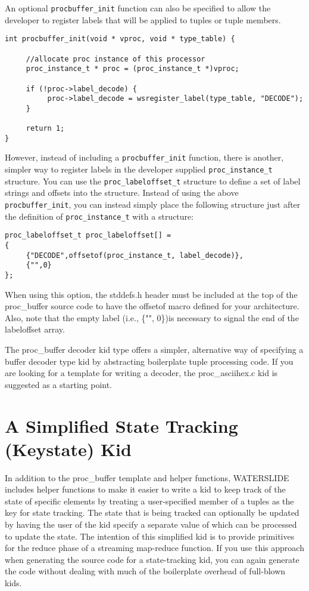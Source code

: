 \documentclass[11pt]{article}
\begin{document}
An optional \texttt{procbuffer\_init} function can also be specified to allow 
the developer to register labels that will be applied to tuples or tuple 
members.

\begin{lstlisting}
int procbuffer_init(void * vproc, void * type_table) {

     //allocate proc instance of this processor
     proc_instance_t * proc = (proc_instance_t *)vproc;

     if (!proc->label_decode) {
          proc->label_decode = wsregister_label(type_table, "DECODE");
     }

     return 1;
}
\end{lstlisting}

However, instead of including a \texttt{procbuffer\_init} function, there is 
another, simpler way to register labels in the developer supplied
\texttt{proc\_instance\_t} structure.  You can use the
\texttt{proc\_labeloffset\_t} structure to define a set of label strings and 
offsets into the structure.  Instead of using the above 
\texttt{procbuffer\_init}, you can instead simply place the following structure
just after the definition of \texttt{proc\_instance\_t} with a structure:

\begin{lstlisting}
proc_labeloffset_t proc_labeloffset[] =
{
     {"DECODE",offsetof(proc_instance_t, label_decode)},
     {"",0}
};
\end{lstlisting}

When using this option, the stddefs.h header must be included at the top of the
proc\_buffer source code to have  the offsetof macro defined for your
architecture.  Also, note that the empty label (i.e., \{"", 0\})is
necessary to signal the end of the labeloffset array.

The proc\_buffer decoder kid type offers a simpler, alternative way of 
specifying a buffer decoder type kid by abstracting boilerplate tuple 
processing code. If you are looking for a template for writing a decoder, the 
proc\_asciihex.c kid is suggested as a starting point. 

\section {A Simplified State Tracking (Keystate) Kid}
In addition to the proc\_buffer template and helper functions, WATERSLIDE includes
helper functions to make it easier to write a kid to keep track of the state 
of specific elements by treating a user-specified member of a tuples as
the key for state tracking.  The state that is being tracked can optionally 
be updated by having  the user of the kid specify a separate value of which can
be processed to update the state. The intention of this simplified kid is to
provide primitives for the reduce phase of a streaming map-reduce function.  
If you use this approach when generating the source code for a state-tracking
kid, you can again generate the code without dealing with much of the 
boilerplate overhead of full-blown kids. 
\end{document}
